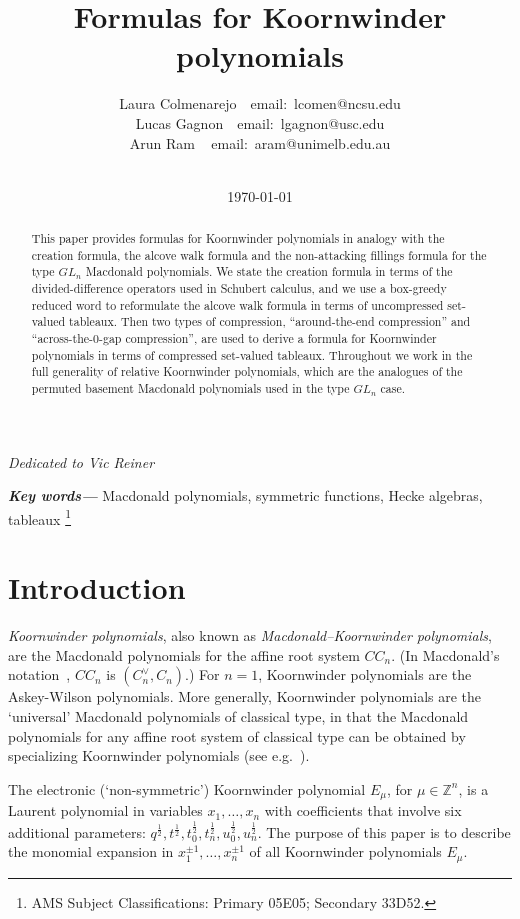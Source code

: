 \documentclass[11pt]{article}
\title{Formulas for Koornwinder polynomials}
\author{
Laura Colmenarejo\quad\ \ email:\ lcomen@ncsu.edu \\
Lucas Gagnon\quad\ \ email:\ lgagnon@usc.edu \\
Arun Ram\quad\quad\ \,\ email:\ aram@unimelb.edu.au \\
\\
}
\date{\today}
\theoremstyle{plain}
\theoremstyle{definition}
\theoremstyle{remark}
\numberwithin{equation}{section}
\providecommand{\keywords}[1]{\textbf{\textit{Key words---}} #1}
\def\ZZ{\mathbb{Z}}
\newcounter{r}
\newcounter{s}
\begin{document}
\maketitle

\vspace{-2em}
\begin{center}
{\sl Dedicated to Vic Reiner}
\end{center}


\begin{abstract}
\noindent

This paper provides formulas for Koornwinder polynomials in analogy with the creation formula, the alcove walk formula and the non-attacking fillings formula for the type $GL_n$ Macdonald polynomials.  We state the creation formula in
terms of the divided-difference operators used in Schubert calculus, and we use a box-greedy reduced word to reformulate the alcove walk formula in terms of uncompressed set-valued tableaux.  
Then two types of compression, ``around-the-end compression'' and ``across-the-$0$-gap compression'', are used to derive a formula for Koornwinder polynomials in terms of compressed set-valued tableaux.  
Throughout we work in the full generality of relative Koornwinder polynomials,
which are the analogues of the permuted basement Macdonald polynomials used in the type $GL_n$ case.
\end{abstract}

\keywords{Macdonald polynomials, symmetric functions, Hecke algebras, tableaux}
\footnote{AMS Subject Classifications: Primary 05E05; Secondary 33D52.}

\tableofcontents


\section*{Introduction}

\emph{Koornwinder polynomials}, also known as \emph{Macdonald--Koornwinder polynomials},  are the Macdonald polynomials for the affine root system $CC_{n}$.  (In Macdonald's notation~\cite[(1.3.18)]{Mac03}, $CC_{n}$ is $(C^\vee_n, C_n)$.)  
For $n = 1$, Koornwinder polynomials are the Askey-Wilson polynomials.
More generally,  Koornwinder polynomials are the `universal' Macdonald polynomials of classical type, in that the Macdonald polynomials for any affine root system of classical type can be obtained by specializing Koornwinder polynomials (see e.g.~\cite[Fig. 1.0.1]{CR24}).


The electronic (`non-symmetric') Koornwinder polynomial $E_{\mu}$, for $\mu \in \ZZ^{n}$, is a Laurent polynomial in variables $x_1, \ldots, x_n$ with coefficients that involve six additional parameters: $q^{\frac12}, t^{\frac12}, t_0^{\frac12}, t_n^{\frac12}, u_0^{\frac12}, u_n^{\frac12}$.  
The purpose of this paper is to describe the monomial expansion in $x_1^{\pm1}, \ldots, x_n^{\pm1}$ of all Koornwinder polynomials $E_{\mu}$.  
\end{document}
